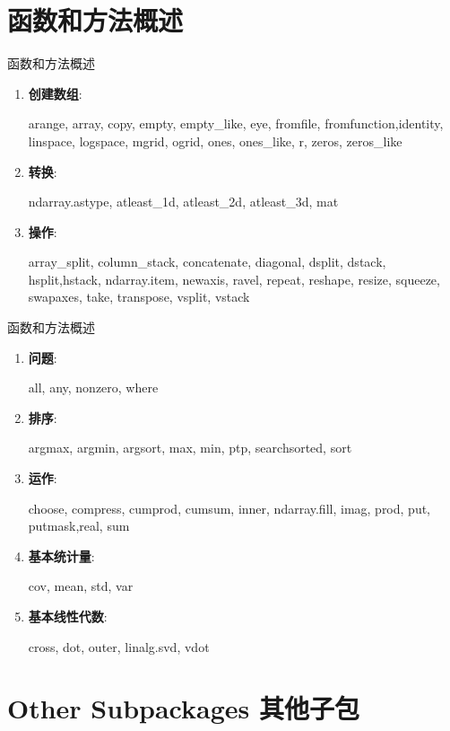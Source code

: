 \documentclass[ignorenonframetext,11pt,xcolor=dvipsnames,hyperref={colorlinks,allcolors=.,urlcolor=blue, citecolor=violet, bookmarksdepth=4},aspectratio=1610]{beamer}
\begin{document}
\hypertarget{section-40}{%
\section{函数和方法概述}\label{section-40}}

\begin{frame}{函数和方法概述}
\protect\hypertarget{section-41}{}

\begin{enumerate}
\item
  \textbf{创建数组}:

  arange, array, copy, empty, empty\_like, eye, fromfile,
  fromfunction,identity, linspace, logspace, mgrid, ogrid, ones,
  ones\_like, r, zeros, zeros\_like
\item
  \textbf{转换}:

  ndarray.astype, atleast\_1d, atleast\_2d, atleast\_3d, mat
\item
  \textbf{操作}:

  array\_split, column\_stack, concatenate, diagonal, dsplit, dstack,
  hsplit,hstack, ndarray.item, newaxis, ravel, repeat, reshape, resize,
  squeeze, swapaxes, take, transpose, vsplit, vstack
\end{enumerate}

\end{frame}

\begin{frame}{函数和方法概述}
\protect\hypertarget{section-42}{}

\begin{enumerate}
\item
  \textbf{问题}:

  all, any, nonzero, where
\item
  \textbf{排序}:

  argmax, argmin, argsort, max, min, ptp, searchsorted, sort
\item
  \textbf{运作}:

  choose, compress, cumprod, cumsum, inner, ndarray.fill, imag, prod,
  put, putmask,real, sum
\item
  \textbf{基本统计量}:

  cov, mean, std, var
\item
  \textbf{基本线性代数}:

  cross, dot, outer, linalg.svd, vdot
\end{enumerate}

\end{frame}

\hypertarget{other-subpackages-}{%
\section{Other Subpackages 其他子包}\label{other-subpackages-}}
\end{document}

